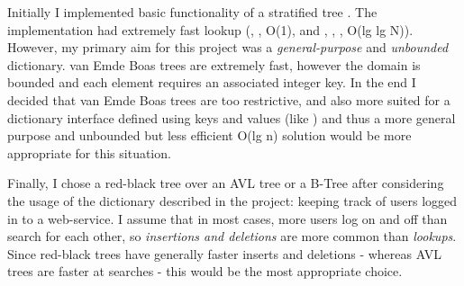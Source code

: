 Initially I implemented basic functionality of a stratified tree \parencite{stratified}. The implementation had extremely fast lookup (, ,  O(1), and , , ,  O(lg lg N)). However, my primary aim for this project was a \textit{general-purpose} and \textit{unbounded} dictionary. van Emde Boas trees are extremely fast, however the domain is bounded and each element requires an associated integer key. In the end I decided that van Emde Boas trees are too restrictive, and also more suited for a dictionary interface defined using keys and values (like ) and thus a more general purpose and unbounded but less efficient O(lg n) solution would be more appropriate for this situation.

Finally, I chose a red-black tree over an AVL tree or a B-Tree after considering the usage of the dictionary described in the project: keeping track of users logged in to a web-service. I assume that in most cases, more users log on and off than search for each other, so \textit{insertions and deletions} are more common than \textit{lookups}. Since red-black trees have generally faster inserts and deletions \parencite{clrs} - whereas AVL trees are faster at searches - this would be the most appropriate choice.